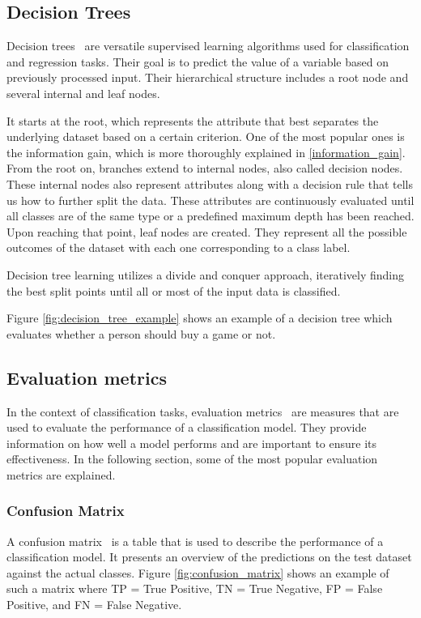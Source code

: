 \subsection{Decision Trees}
Decision trees~\cite{decisiontrees} are versatile supervised learning algorithms used for classification and regression tasks. Their goal is to predict the value of a variable based on previously processed input. Their hierarchical structure includes a root node and several internal and leaf nodes.

It starts at the root, which represents the attribute that best separates the underlying dataset based on a certain criterion. One of the most popular ones is the information gain, which is more thoroughly explained in \ref{information_gain}. From the root on, branches extend to internal nodes, also called decision nodes. These internal nodes also represent attributes along with a decision rule that tells us how to further split the data. These attributes are continuously evaluated until all classes are of the same type or a predefined maximum depth has been reached. Upon reaching that point, leaf nodes are created. They represent all the possible outcomes of the dataset with each one corresponding to a class label.

Decision tree learning utilizes a divide and conquer approach, iteratively finding the best split points until all or most of the input data is classified.

Figure \ref{fig:decision_tree_example} shows an example of a decision tree which evaluates whether a person should buy a game or not.

\subsection{Evaluation metrics}
In the context of classification tasks, evaluation metrics~\cite{evaluation_metrics} are measures that are used to evaluate the performance of a classification model. They provide information on how well a model performs and are important to ensure its effectiveness. In the following section, some of the most popular evaluation metrics are explained.

\subsubsection{Confusion Matrix}
A confusion matrix~\cite{evaluation_metrics} is a table that is used to describe the performance of a classification model. It presents an overview of the predictions on the test dataset against the actual classes. Figure \ref{fig:confusion_matrix} shows an example of such a matrix where TP = True Positive, TN = True Negative, FP = False Positive, and FN = False Negative.

